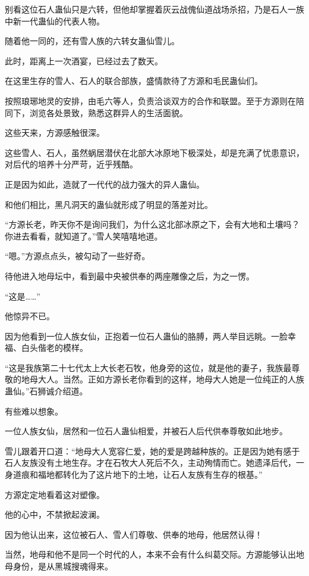 \begin{this_body}
别看这位石人蛊仙只是六转，但他却掌握着灰云战傀仙道战场杀招，乃是石人一族中新一代蛊仙的代表人物。

随着他一同的，还有雪人族的六转女蛊仙雪儿。

此时，距离上一次酒宴，已经过去了数天。

在这里生存的雪人、石人的联合部族，盛情款待了方源和毛民蛊仙们。

按照琅琊地灵的安排，由毛六等人，负责洽谈双方的合作和联盟。至于方源则在陪同下，浏览各处景致，熟悉这群异人的生活面貌。

这些天来，方源感触很深。

这些雪人、石人，虽然蜗居潜伏在北部大冰原地下极深处，却是充满了忧患意识，对后代的培养十分严苛，近乎残酷。

正是因为如此，造就了一代代的战力强大的异人蛊仙。

和他们相比，黑凡洞天的蛊仙就形成了明显的落差对比。

“方源长老，昨天你不是询问我们，为什么这北部冰原之下，会有大地和土壤吗？你进去看看，就知道了。”雪人笑嘻嘻地道。

“嗯。”方源点点头，被勾动了一些好奇。

待他进入地母坛中，看到最中央被供奉的两座雕像之后，为之一愣。

“这是……”

他惊异不已。

因为他看到一位人族女仙，正抱着一位石人蛊仙的胳膊，两人举目远眺。一脸幸福、白头偕老的模样。

“这是我族第二十七代太上大长老石牧，他身旁的这位，就是他的妻子，我族最尊敬的地母大人。当然。正如方源长老你看到的这样，地母大人她是一位纯正的人族蛊仙。”石狮诚介绍道。

有些难以想象。

一位人族女仙，居然和一位石人蛊仙相爱，并被石人后代供奉尊敬如此地步。

雪儿跟着开口道：“地母大人宽容仁爱，她的爱是跨越种族的。正是因为她有感于石人友族没有土地生存。才在石牧大人死后不久，主动殉情而亡。她遗泽后代，一身道痕和福地都转化为了这片地下的土地，让石人友族有生存的根基。”

方源定定地看着这对塑像。

他的心中，不禁掀起波澜。

因为他认出来，这位被石人、雪人们尊敬、供奉的地母，他居然认得！

当然，地母和他不是同一个时代的人，本来不会有什么纠葛交际。方源能够认出地母身份，是从黑城搜魂得来。


\end{this_body}
